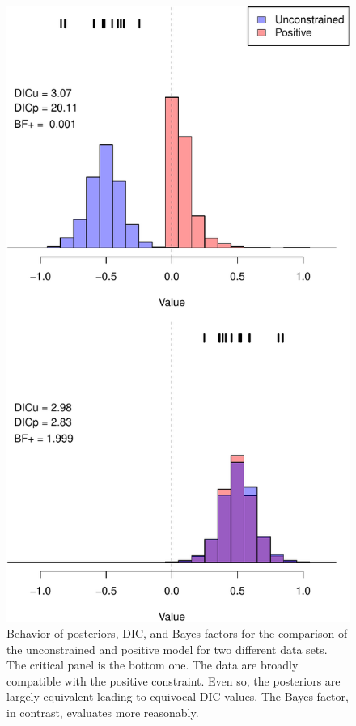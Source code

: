 \documentclass[english,man]{apa6}
\theoremstyle{definition}
\theoremstyle{definition}
\theoremstyle{definition}
\theoremstyle{remark}
\begin{document}
\begin{figure}[htbp]
\centering
\includegraphics{p_files/figure-latex/dic-1.pdf}
\caption{\label{fig:dic}Behavior of posteriors, DIC, and Bayes factors for
the comparison of the unconstrained and positive model for two different
data sets. The critical panel is the bottom one. The data are broadly
compatible with the positive constraint. Even so, the posteriors are
largely equivalent leading to equivocal DIC values. The Bayes factor, in
contrast, evaluates more reasonably.}
\end{figure}
\end{document}
